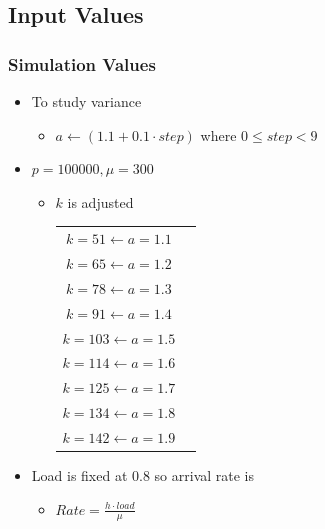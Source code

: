 \documentclass[red]{beamer}
\begin{document}
\subsection{Input Values}
\begin{frame}
	\frametitle{Simulation Values}
	\vspace{-.3cm}
	\begin{itemize}
	\item To study variance
		\begin{itemize}
		\item $ a \leftarrow (1.1 + 0.1 \cdot step) $ where $ 0 \le step < 9 $ 
		\end{itemize}
	\item $ p = 100000, \mu = 300 $
		\begin{itemize}
		\item $k$ is adjusted \linebreak
		\begin{tabular}{cc}
			$k = 51 \leftarrow a = 1.1$ \\
			$k = 65 \leftarrow a = 1.2$ \\
			$k = 78 \leftarrow a = 1.3$ \\
			$k = 91 \leftarrow a = 1.4$	\\		
			$k = 103 \leftarrow a = 1.5$ \\
			$k = 114 \leftarrow a = 1.6$ \\
			$k = 125 \leftarrow a = 1.7$ \\
			$k = 134 \leftarrow a = 1.8$ \\
			$k = 142 \leftarrow a = 1.9$ \\
		\end{tabular}
		\end{itemize}
	\item Load is fixed at $0.8$ so arrival rate is
	\begin{itemize}
		\item $Rate = \frac{h \cdot load}{\mu}$
	\end{itemize}
	\end{itemize}		
	
\end{frame}
\end{document}
